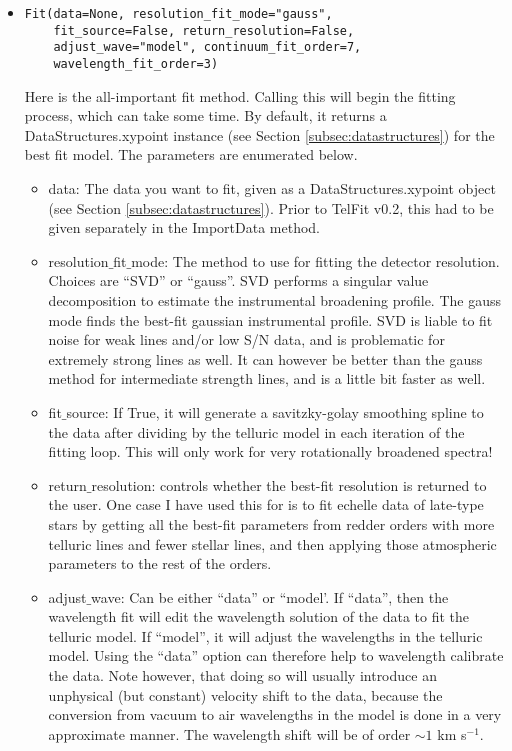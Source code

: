 \documentclass{article}
\begin{document}
\begin{itemize}
  \item \begin{Verbatim}[commandchars=\\\{\}]
Fit(data=None, resolution_fit_mode="gauss", 
    fit_source=False, return_resolution=False, 
    adjust_wave="model", continuum_fit_order=7, 
    wavelength_fit_order=3)
    \end{Verbatim}
    Here is the all-important fit method. Calling this will begin the fitting process, which can take some time. By default, it returns a DataStructures.xypoint instance (see Section \ref{subsec:datastructures}) for the best fit model. The parameters are enumerated below.
    
    \begin{itemize}

      \item data: The data you want to fit, given as a DataStructures.xypoint object (see Section \ref{subsec:datastructures}). Prior to TelFit v0.2, this had to be given separately in the ImportData method.
    
      \item resolution$\_$fit$\_$mode: The method to use for fitting the detector resolution. Choices are ``SVD'' or ``gauss''. SVD performs a singular value decomposition to estimate the instrumental broadening profile. The gauss mode finds the best-fit gaussian instrumental profile. SVD is liable to fit noise for weak lines and/or low S/N data, and is problematic for extremely strong lines as well. It can however be better than the gauss method for intermediate strength lines, and is a little bit faster as well.
      
      \item fit$\_$source: If True, it will generate a savitzky-golay smoothing spline to the data after dividing by the telluric model in each iteration of the fitting loop. This will only work for very rotationally broadened spectra!

      \item return$\_$resolution: controls whether the best-fit resolution is returned to the user. One case I have used this for is to fit echelle data of late-type stars by getting all the best-fit parameters from redder orders with more telluric lines and fewer stellar lines, and then applying those atmospheric parameters to the rest of the orders.
      
      \item adjust$\_$wave: Can be either ``data'' or ``model'. If ``data'', then the wavelength fit will edit the wavelength solution of the data to fit the telluric model. If ``model'', it will adjust the wavelengths in the telluric model. Using the ``data'' option can therefore help to wavelength calibrate the data. Note however, that doing so will usually introduce an unphysical (but constant) velocity shift to the data, because the conversion from vacuum to air wavelengths in the model is done in a very approximate manner. The wavelength shift will be of order $\sim 1$ km s$^{-1}$.
      

\end{itemize}
\end{itemize}
\end{document}
